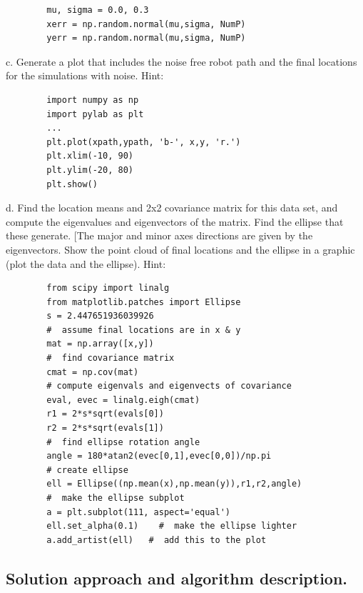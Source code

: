 \documentclass[letterpaper,11pt]{texMemo} %
\begin{document}
\begin{tiny}
    \begin{lstlisting}
        mu, sigma = 0.0, 0.3
        xerr = np.random.normal(mu,sigma, NumP)
        yerr = np.random.normal(mu,sigma, NumP)
    \end{lstlisting}
\end{tiny}

c. Generate a plot that includes the noise free robot path and the final locations for the
simulations with noise. Hint:

\begin{tiny}
    \begin{lstlisting}
        import numpy as np
        import pylab as plt
        ...
        plt.plot(xpath,ypath, 'b-', x,y, 'r.')
        plt.xlim(-10, 90)
        plt.ylim(-20, 80)
        plt.show()
    \end{lstlisting}
\end{tiny}

d. Find the location means and 2x2 covariance matrix for this data set, and compute the eigenvalues
and eigenvectors of the matrix. Find the ellipse that these generate. [The major and minor axes
directions are given by the eigenvectors. Show the point cloud of final locations and the ellipse 
in a graphic (plot the data and the ellipse). Hint:

\begin{tiny}
    \begin{lstlisting}
        from scipy import linalg
        from matplotlib.patches import Ellipse
        s = 2.447651936039926
        #  assume final locations are in x & y
        mat = np.array([x,y])
        #  find covariance matrix
        cmat = np.cov(mat)
        # compute eigenvals and eigenvects of covariance
        eval, evec = linalg.eigh(cmat)
        r1 = 2*s*sqrt(evals[0])
        r2 = 2*s*sqrt(evals[1])
        #  find ellipse rotation angle
        angle = 180*atan2(evec[0,1],evec[0,0])/np.pi
        # create ellipse
        ell = Ellipse((np.mean(x),np.mean(y)),r1,r2,angle)
        #  make the ellipse subplot
        a = plt.subplot(111, aspect='equal')
        ell.set_alpha(0.1)    #  make the ellipse lighter
        a.add_artist(ell)   #  add this to the plot
    \end{lstlisting}
\end{tiny}

\subsection*{Solution approach and algorithm description.}
\end{document}
